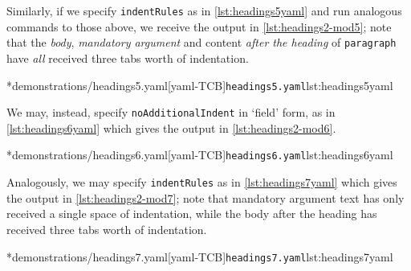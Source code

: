 	Similarly, if we specify \texttt{indentRules} as in \cref{lst:headings5yaml} and run analogous commands to those above,
	we receive the output in \cref{lst:headings2-mod5}; note that the \emph{body}, \emph{mandatory argument} and content
	\emph{after the heading} of \texttt{paragraph} have \emph{all} received three tabs worth of indentation.

	\begin{minipage}{.55\textwidth}
	\end{minipage}%
	\hfill
	\begin{minipage}{.42\textwidth}
		\cmhlistingsfromfile[style=yaml-LST]*{demonstrations/headings5.yaml}[yaml-TCB]{\texttt{headings5.yaml}}{lst:headings5yaml}
	\end{minipage}

	We may, instead, specify \texttt{noAdditionalIndent} in `field' form, as in \cref{lst:headings6yaml} which gives the output in \cref{lst:headings2-mod6}.

	\begin{minipage}{.45\textwidth}
	\end{minipage}%
	\hfill
	\begin{minipage}{.45\textwidth}
		\cmhlistingsfromfile[style=yaml-LST]*{demonstrations/headings6.yaml}[yaml-TCB]{\texttt{headings6.yaml}}{lst:headings6yaml}
	\end{minipage}

	Analogously, we may specify \texttt{indentRules} as in \cref{lst:headings7yaml} which gives the output in \cref{lst:headings2-mod7};
	note that mandatory argument text has only received a single space of indentation, while the body after the heading has
	received three tabs worth of indentation.

	\begin{minipage}{.45\textwidth}
	\end{minipage}%
	\hfill
	\begin{minipage}{.45\textwidth}
		\cmhlistingsfromfile[style=yaml-LST]*{demonstrations/headings7.yaml}[yaml-TCB]{\texttt{headings7.yaml}}{lst:headings7yaml}
	\end{minipage}

